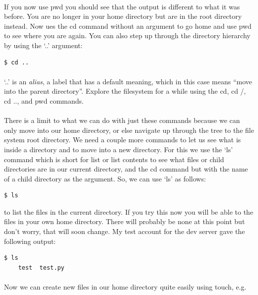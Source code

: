 \documentclass[12pt, a4paper, oneside]{book}
\begin{document}
\paragraph{} If you now use pwd you should see that the output is different to what it was before. You are no longer in your home directory but are in the root directory instead. Now ues the cd command without an argument to go home and use pwd to see where you are again. You can also step up through the directory hierarchy by using the `..' argument:

\begin{lstlisting}[style=DOS]
    $ cd ..
\end{lstlisting}
\paragraph{} `..' is an \emph{alias}, a label that has a default meaning, which in this case means ``move into the parent directory''. Explore the filesystem for a while using the cd, cd /, cd .., and pwd commands.

\paragraph{} There is a limit to what we can do with just these commands because we can only move into our home directory, or else navigate up through the tree to the file system root directory. We need a couple more commands to let us see what is inside a directory and to move into a new directory. For this we use the `ls' command which is short for list or list contents to see what files or child directories are in our current directory, and the cd command but with the name of a child directory as the argument. So, we can use `ls' as follows:

\begin{lstlisting}[style=DOS]
    $ ls
\end{lstlisting}

to list the files in the current directory. If you try this now you will be able to the files in your own home directory. There will probably be none at this point but don't worry, that will soon change. My test account for the dev server gave the following output:

\begin{lstlisting}[style=DOS]
    $ ls
    test  test.py
\end{lstlisting}

\paragraph{} Now we can create new files in our home directory quite easily using touch, e.g.
\end{document}
